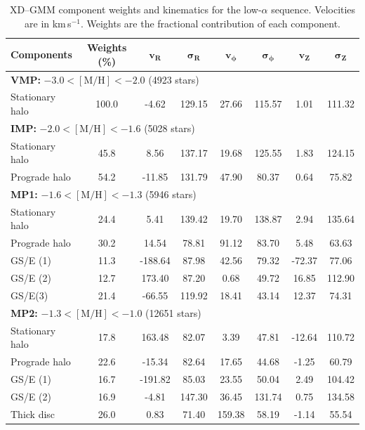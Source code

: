 \documentclass[a4paper,12pt]{article}
\begin{document}
\begin{table}[H]
\centering
\begin{tabular}{lccccccc}
\hline
\textbf{Components} & \textbf{Weights (\%)} & $\mathbf{v_R}$ & $\boldsymbol{\sigma_R}$ & $\mathbf{v_\phi}$ & $\boldsymbol{\sigma_\phi}$ & $\mathbf{v_Z}$ & $\boldsymbol{\sigma_Z}$ \\
\hline
\multicolumn{8}{l}{\textbf{VMP:} $-3.0 < \mathrm{[M/H]} < -2.0$ (4923 stars)} \\
Stationary halo      & 100.0 &  -4.62 & 129.15 &  27.66 & 115.57 &  1.01 & 111.32 \\
\hline
\multicolumn{8}{l}{\textbf{IMP:} $-2.0 < \mathrm{[M/H]} < -1.6$ (5028 stars)} \\
Stationary halo      & 45.8  &   8.56 & 137.17 &  19.68 & 125.55 &  1.83 & 124.15 \\
Prograde halo        & 54.2  & -11.85 & 131.79 &  47.90 &  80.37 &  0.64 &  75.82 \\
\hline
\multicolumn{8}{l}{\textbf{MP1:} $-1.6 < \mathrm{[M/H]} < -1.3$ (5946 stars)} \\
Stationary halo      & 24.4  &   5.41 & 139.42 &  19.70 & 138.87 &  2.94 & 135.64 \\
Prograde halo        & 30.2  &  14.54 &  78.81 &  91.12 &  83.70 &  5.48 &  63.63 \\
GS/E (1)             & 11.3  &-188.64 &  87.98 &  42.56 &  79.32 &-72.37 &  77.06 \\
GS/E (2)             & 12.7  & 173.40 &  87.20 &   0.68 &  49.72 & 16.85 & 112.90 \\
GS/E(3)              & 21.4  & -66.55 & 119.92 &  18.41 &  43.14 & 12.37 &  74.31 \\
\hline
\multicolumn{8}{l}{\textbf{MP2:} $-1.3 < \mathrm{[M/H]} < -1.0$ (12651 stars)} \\
Stationary halo      & 17.8  & 163.48 &  82.07 &   3.39 &  47.81 &-12.64 & 110.72 \\
Prograde halo        & 22.6  & -15.34 &  82.64 &  17.65 &  44.68 & -1.25 &  60.79 \\
GS/E (1)             & 16.7  &-191.82 &  85.03 &  23.55 &  50.04 &  2.49 & 104.42 \\
GS/E (2)             & 16.9  &  -4.81 & 147.30 &  36.45 & 131.74 &  0.75 & 134.58 \\
Thick disc           & 26.0  &   0.83 &  71.40 & 159.38 &  58.19 & -1.14 &  55.54 \\
\hline
\end{tabular}
\caption{XD--GMM component weights and kinematics for the low-$\alpha$ sequence.  
         Velocities are in km\,s$^{-1}$. Weights are the fractional contribution of each component.}
\label{tab:gmm_lowa_stats}
\end{table}
\end{document}
